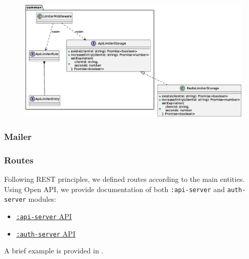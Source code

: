 \documentclass{scrartcl}
\begin{document}
\begin{figure}
    \centering
    \includegraphics[width=\linewidth]{figures/api-limiter-api.eps}
    \label{fig:api-limiter-api} 
\end{figure}

\subsubsection{Mailer}


\subsubsection{Routes}

Following REST principles, we defined routes according to the main entities.
Using Open API, we provide documentation of both \texttt{:api-server} and \texttt{auth-server} modules:
\begin{itemize}
    \item \href{https://tassiluca.github.io/ChainVote/swagger-ui-api/}{\texttt{:api-server} API}
    \item \href{https://tassiluca.github.io/ChainVote/swagger-ui-auth/}{\texttt{:auth-server} API}
\end{itemize}

A brief example is provided in .

\end{document}
